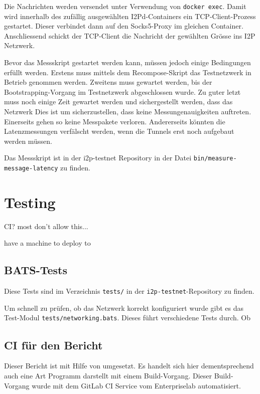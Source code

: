 Die Nachrichten werden versendet unter Verwendung von \lstinline|docker exec|.
Damit wird innerhalb des zufällig ausgewählten I2Pd-Containers ein TCP-Client-Prozess gestartet.
Dieser verbindet dann auf den Socks5-Proxy im gleichen Container.
Anschliessend schickt der TCP-Client die Nachricht der gewählten Grösse ins I2P Netzwerk.

Bevor das Messskript gestartet werden kann, müssen jedoch einige Bedingungen erfüllt werden.
Erstens muss mittels dem Recompose-Skript das Testnetzwerk in Betrieb genommen werden.
Zweitens muss gewartet werden, bis der Bootstrapping-Vorgang im Testnetzwerk abgeschlossen wurde.
Zu guter letzt muss noch einige Zeit gewartet werden und sichergestellt werden, dass das Netzwerk 
Dies ist um sicherzustellen, dass keine Messungenauigkeiten auftreten.
Einerseits gehen so keine Messpakete verloren. Andererseits könnten die Latenzmessungen verfälscht werden, wenn die Tunnels erst noch aufgebaut werden müssen.

Das Messskript ist in der i2p-testnet Repository in der Datei \lstinline|bin/measure-message-latency| zu finden.

\section{Testing}

CI? most don't allow this...

have a machine to deploy to

\subsection{BATS-Tests}

Diese Tests sind im Verzeichnis \lstinline|tests/| in der \lstinline|i2p-testnet|-Repository zu finden.

Um schnell zu prüfen, ob das Netzwerk korrekt konfiguriert wurde gibt es das Test-Modul \lstinline|tests/networking.bats|.
Dieses führt verschiedene Tests durch. Ob

\subsection{CI für den Bericht}

Dieser Bericht ist mit Hilfe von \LaTex umgesetzt.
Es handelt sich hier dementsprechend auch eine Art Programm darstellt mit einem Build-Vorgang.
Dieser Build-Vorgang wurde mit dem GitLab CI Service vom Enterpriselab automatisiert.

